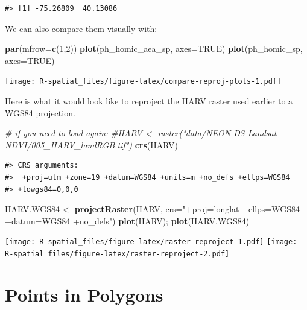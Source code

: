 \documentclass[]{book}
\newenvironment{Shaded}{\begin{snugshade}}{\end{snugshade}}
\newcommand{\KeywordTok}[1]{\textcolor[rgb]{0.13,0.29,0.53}{\textbf{#1}}}
\newcommand{\DataTypeTok}[1]{\textcolor[rgb]{0.13,0.29,0.53}{#1}}
\newcommand{\DecValTok}[1]{\textcolor[rgb]{0.00,0.00,0.81}{#1}}
\newcommand{\StringTok}[1]{\textcolor[rgb]{0.31,0.60,0.02}{#1}}
\newcommand{\CommentTok}[1]{\textcolor[rgb]{0.56,0.35,0.01}{\textit{#1}}}
\newcommand{\OtherTok}[1]{\textcolor[rgb]{0.56,0.35,0.01}{#1}}
\newcommand{\NormalTok}[1]{#1}
\theoremstyle{definition}
\theoremstyle{definition}
\theoremstyle{definition}
\theoremstyle{remark}
\begin{document}
\begin{verbatim}
#> [1] -75.26809  40.13086
\end{verbatim}

We can also compare them visually with:

\begin{Shaded}
\begin{Highlighting}[]
\KeywordTok{par}\NormalTok{(}\DataTypeTok{mfrow=}\KeywordTok{c}\NormalTok{(}\DecValTok{1}\NormalTok{,}\DecValTok{2}\NormalTok{)) }
\KeywordTok{plot}\NormalTok{(ph_homic_aea_sp, }\DataTypeTok{axes=}\OtherTok{TRUE}\NormalTok{)}
\KeywordTok{plot}\NormalTok{(ph_homic_sp, }\DataTypeTok{axes=}\OtherTok{TRUE}\NormalTok{)}
\end{Highlighting}
\end{Shaded}

\texttt{[image: R-spatial\_files/figure-latex/compare-reproj-plots-1.pdf]}

Here is what it would look like to reproject the HARV raster used
earlier to a WGS84 projection.

\begin{Shaded}
\begin{Highlighting}[]
\CommentTok{# if you need to load again:}
\CommentTok{#HARV <- raster("data/NEON-DS-Landsat-NDVI/005_HARV_landRGB.tif")}
\KeywordTok{crs}\NormalTok{(HARV)}
\end{Highlighting}
\end{Shaded}

\begin{verbatim}
#> CRS arguments:
#>  +proj=utm +zone=19 +datum=WGS84 +units=m +no_defs +ellps=WGS84
#> +towgs84=0,0,0
\end{verbatim}

\begin{Shaded}
\begin{Highlighting}[]
\NormalTok{HARV.WGS84 <-}\StringTok{ }\KeywordTok{projectRaster}\NormalTok{(HARV, }\DataTypeTok{crs=}\StringTok{"+proj=longlat +ellps=WGS84 +datum=WGS84 +no_defs"}\NormalTok{)}
\KeywordTok{plot}\NormalTok{(HARV); }\KeywordTok{plot}\NormalTok{(HARV.WGS84)}
\end{Highlighting}
\end{Shaded}

\texttt{[image: R-spatial\_files/figure-latex/raster-reproject-1.pdf]}
\texttt{[image: R-spatial\_files/figure-latex/raster-reproject-2.pdf]}

\section{Points in Polygons}\label{points-in-polygons}
\end{document}
